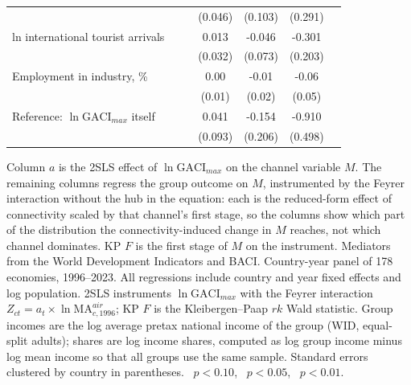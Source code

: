 \begin{table}[H]
\begin{minipage}{\linewidth}
{\begin{tabular}{lcccccc}
 &  &  & (0.046) & (0.103) & (0.291) \\
ln international tourist arrivals &  &  & 0.013 & -0.046 & -0.301 \\
 &  &  & (0.032) & (0.073) & (0.203) \\
Employment in industry, \% &  &  & 0.00 & -0.01 & -0.06 \\
 &  &  & (0.01) & (0.02) & (0.05) \\
Reference: $\ln\mathrm{GACI}_{max}$ itself &  &  & 0.041 & -0.154 & -0.910\sym{*} \\
 &  &  & (0.093) & (0.206) & (0.498) \\
\bottomrule
\end{tabular}}
\par\vspace{3pt}\begin{flushleft}\footnotesize Column $a$ is the 2SLS effect of $\ln\mathrm{GACI}_{max}$ on the channel variable $M$. The remaining columns regress the group outcome on $M$, instrumented by the Feyrer interaction without the hub in the equation: each is the reduced-form effect of connectivity scaled by that channel's first stage, so the columns show which part of the distribution the connectivity-induced change in $M$ reaches, not which channel dominates. KP $F$ is the first stage of $M$ on the instrument. Mediators from the World Development Indicators and BACI. Country-year panel of 178 economies, 1996--2023. All regressions include country and year fixed effects and log population. 2SLS instruments $\ln\mathrm{GACI}_{max}$ with the Feyrer interaction $Z_{ct}=a_t\times\ln\mathrm{MA}^{air}_{c,1996}$; KP $F$ is the Kleibergen--Paap $rk$ Wald statistic. Group incomes are the log average pretax national income of the group (WID, equal-split adults); shares are log income shares, computed as log group income minus log mean income so that all groups use the same sample. Standard errors clustered by country in parentheses. \sym{*}~$p<0.10$, \sym{**}~$p<0.05$, \sym{***}~$p<0.01$.\end{flushleft}
\end{minipage}
\end{table}
